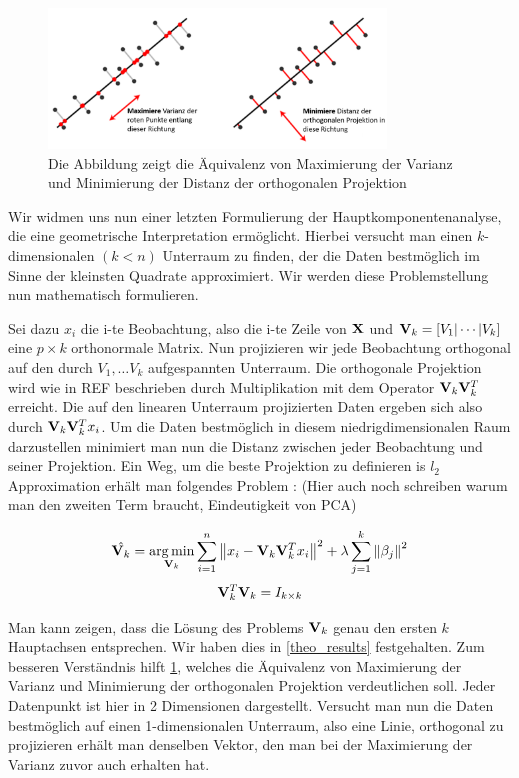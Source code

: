 \begin{figure}
\centering
\includegraphics[width = 0.8\textwidth]{figures/pca_projection_explanation_german.png}
\caption{Die Abbildung zeigt die Äquivalenz von Maximierung der Varianz und Minimierung der Distanz der orthogonalen Projektion}
\label{pca_projection_explanation}
\end{figure}

Wir widmen uns nun einer letzten Formulierung der Hauptkomponentenanalyse, die eine geometrische Interpretation ermöglicht. Hierbei versucht man einen $k$-dimensionalen $(k < n)$ Unterraum zu finden, der die Daten bestmöglich im Sinne der kleinsten Quadrate approximiert. Wir werden diese Problemstellung nun mathematisch formulieren.

Sei dazu $x_i$ die i-te Beobachtung, also die i-te Zeile von $\mathbf{X}$ und $\mathbf{V}_k = [V_1 \vert \cdots \vert V_k]$ eine $p \times k$ orthonormale Matrix. Nun projizieren wir jede Beobachtung orthogonal auf den durch $V_1, \ldots V_k$ aufgespannten Unterraum. Die orthogonale Projektion wird wie in REF beschrieben durch Multiplikation mit dem Operator $\mathbf{V}_k \mathbf{V}_k^T$ erreicht. Die auf den linearen Unterraum projizierten Daten ergeben sich also durch $\mathbf{V}_k \mathbf{V}_k^T x_i$. Um die Daten bestmöglich in diesem niedrigdimensionalen Raum darzustellen minimiert man nun die Distanz zwischen jeder Beobachtung und seiner Projektion. Ein Weg, um die beste Projektion zu definieren is $l_2$ Approximation erhält man folgendes Problem \cite{zou_sparsepca}: (Hier auch noch schreiben warum man den zweiten Term braucht, Eindeutigkeit von PCA)

$$\hat{\mathbf{V}_k} = \operatorname*{arg\,min}_{\mathbf{V}_k} \sum_{i=1}^{n} \left\lVert x_i - \mathbf{V}_k \mathbf{V}_k^Tx_i \right\rVert^2 + \lambda \sum_{j=1}^{k}\left\lVert \beta_j \right\rVert^2$$
$$\mathbf{V}_k^T\mathbf{V}_k = I_{k \times k}$$

Man kann zeigen, dass die Lösung des Problems $\mathbf{V}_k$ genau den ersten $k$ Hauptachsen entsprechen. Wir haben dies in \ref{theo_results} festgehalten.  \cite{vidal} Zum besseren Verständnis hilft \ref{pca_projection_explanation}, welches die Äquivalenz von Maximierung der Varianz und Minimierung der orthogonalen Projektion verdeutlichen soll. Jeder Datenpunkt ist hier in 2 Dimensionen dargestellt. Versucht man nun die Daten bestmöglich auf einen 1-dimensionalen Unterraum, also eine Linie, orthogonal zu projizieren erhält man denselben Vektor, den man bei der Maximierung der Varianz zuvor auch erhalten hat. 


